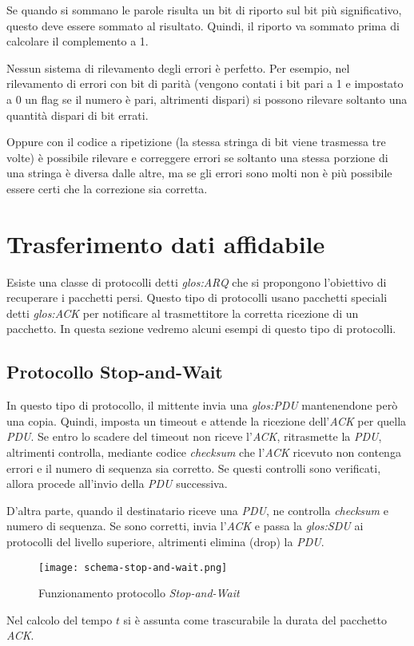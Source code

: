 \begin{note}
    Se quando si sommano le parole risulta un bit di riporto sul bit più
    significativo, questo deve essere sommato al risultato. Quindi, il riporto
    va sommato prima di calcolare il complemento a 1.
\end{note}

\begin{note}
    Nessun sistema di rilevamento degli errori è perfetto. Per esempio, nel
    rilevamento di errori con bit di parità (vengono contati i bit pari a 1 e
    impostato a 0 un flag se il numero è pari, altrimenti dispari) si possono
    rilevare soltanto una quantità dispari di bit errati.

    Oppure con il codice a ripetizione (la stessa stringa di bit viene trasmessa
    tre volte) è possibile rilevare e correggere errori se soltanto una stessa
    porzione di una stringa è diversa dalle altre, ma se gli errori sono molti
    non è più possibile essere certi che la correzione sia corretta.
\end{note}

\section{Trasferimento dati affidabile}
Esiste una classe di protocolli detti \emph{\gls{glos:ARQ}} che si propongono
l'obiettivo di recuperare i pacchetti persi. Questo tipo di protocolli usano
pacchetti speciali detti \emph{\gls{glos:ACK}} per notificare al trasmettitore
la corretta ricezione di un pacchetto.
In questa sezione vedremo alcuni esempi di questo tipo di protocolli.

\subsection{Protocollo Stop-and-Wait}
In questo tipo di protocollo, il mittente invia una \emph{\gls{glos:PDU}}
mantenendone però una copia. Quindi, imposta un timeout e attende la ricezione
dell'\emph{ACK} per quella \emph{PDU}. Se entro lo scadere del timeout non riceve
l'\emph{ACK}, ritrasmette la \emph{PDU}, altrimenti controlla, mediante codice
\emph{checksum} che l'\emph{ACK} ricevuto non contenga errori e il numero di
sequenza sia corretto. Se questi controlli sono verificati, allora procede
all'invio della \emph{PDU} successiva.

D'altra parte, quando il destinatario riceve una \emph{PDU}, ne controlla
\emph{checksum} e numero di sequenza. Se sono corretti, invia l'\emph{ACK} e
passa la \emph{\gls{glos:SDU}} ai protocolli del livello superiore, altrimenti
elimina (drop) la \emph{PDU}.
\newpage
\begin{figure}[ht!]
    \centering
    \texttt{[image: schema-stop-and-wait.png]}
    \caption{Funzionamento protocollo \emph{Stop-and-Wait}}
\end{figure}
\begin{note}
    Nel calcolo del tempo $t$ si è assunta come trascurabile la durata del
    pacchetto \emph{ACK}.
\end{note}

